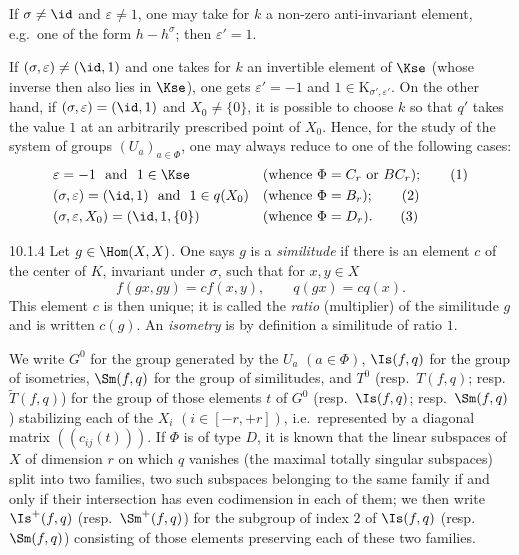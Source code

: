 \documentclass[12pt,a4paper,oneside,english]{smfart}
\makeatletter
\newcommand{\btanchor}[1]{\leavevmode\Hy@raisedlink{\hypertarget{bt:#1}{}}}
\theoremstyle{definition}
\theoremstyle{bt}
\makeatother
\begin{document}
If $\sigma\neq\id$ and $\varepsilon\neq1$, one may take for $k$ a non-zero
anti-invariant element, e.g.\ one of the form $h-h^{\sigma}$; then
$\varepsilon'=1$.

If $(\sigma,\varepsilon)\neq(\id,1)$ and one takes for $k$ an invertible element
of $\Kse$ (whose inverse then also lies in $\Kse$), one gets
$\varepsilon'=-1$ and $1\in\mathrm{K}_{\sigma',\varepsilon'}$. On the other
hand, if $(\sigma,\varepsilon)=(\id,1)$ and $X_0\neq\{0\}$, it is possible to
choose $k$ so that $q'$ takes the value $1$ at an arbitrarily prescribed point
of $X_0$. Hence, for the study of the system of groups $(U_a)_{a\in\Phi}$, one
may always reduce to one of the following cases:
\begin{align}
&\varepsilon=-1 \ \text{ and }\ 1\in\Kse
   &&(\text{whence } \Phi=C_r \text{ or } BC_r); \tag{1}\\
&(\sigma,\varepsilon)=(\id,1) \ \text{ and }\ 1\in q(X_0)
   &&(\text{whence } \Phi=B_r); \tag{2}\\
&(\sigma,\varepsilon,X_0)=(\id,1,\{0\})
   &&(\text{whence } \Phi=D_r). \tag{3}
\end{align}

\num{10.1.4}\btanchor{10.1.4} Let $g\in\Hom(X,X)$. One says $g$ is a \emph{similitude} if there
is an element $c$ of the center of $K$, invariant under $\sigma$, such that for
$x,y\in X$
\[
f(gx,gy)=cf(x,y),\qquad q(gx)=cq(x).
\]
This element $c$ is then unique; it is called the \emph{ratio} (multiplier) of
the similitude $g$ and is written $c(g)$. An \emph{isometry} is by definition a
similitude of ratio $1$.

We write $G^{0}$ for the group generated by the $U_a$ $(a\in\Phi)$,
$\Is(f,q)$ for the group of isometries, $\Sm(f,q)$ for the group of similitudes,
and $T^{0}$ (resp.\ $T(f,q)$; resp.\ $\widetilde T(f,q)$) for the group of those
elements $t$ of $G^{0}$ (resp.\ $\Is(f,q)$; resp.\ $\Sm(f,q)$) stabilizing each
of the $X_i$ $(i\in[-r,+r])$, i.e.\ represented by a diagonal matrix
$((c_{ij}(t)))$. If $\Phi$ is of type $D$, it is known that the linear subspaces
of $X$ of dimension $r$ on which $q$ vanishes (the maximal totally singular
subspaces) split into two families, two such subspaces belonging to the same
family if and only if their intersection has even codimension in each of them;
we then write $\Is^{+}(f,q)$ (resp.\ $\Sm^{+}(f,q)$) for the subgroup of index
$2$ of $\Is(f,q)$ (resp.\ $\Sm(f,q)$) consisting of those elements preserving
each of these two families.
\end{document}
